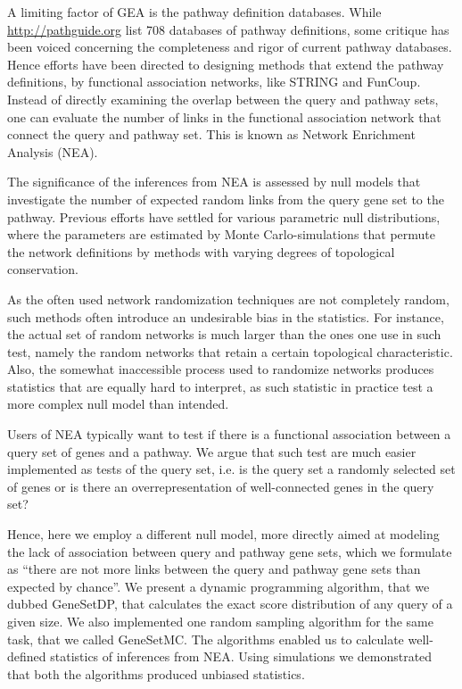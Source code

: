 \documentclass[a4paper,american]{lipics-v2016}
\begin{document}
A limiting factor of GEA is the pathway definition databases. While \url{http://pathguide.org} list 708 databases of pathway definitions\cite{bader2006pathguide},  some critique has been voiced concerning the completeness and rigor of current pathway databases. Hence efforts have been directed to designing methods that extend the pathway definitions, by functional association networks, like STRING\cite{szklarczyk2014string} and FunCoup\cite{ogris2017funcoup}. Instead of directly examining the overlap between the query and pathway sets, one can evaluate the number of links in the functional association network that connect the query and pathway set\cite{alexeyenko2012network, glaab2012enrichnet, mccormack2013statistical, ogris2016novel, signorelli2016neat}. This is known as Network Enrichment Analysis (NEA).

The significance of the inferences from NEA is assessed by null models that investigate the number of expected random links from the query gene set to the pathway. Previous efforts have settled for various parametric null distributions, where the parameters are estimated by Monte Carlo-simulations that permute the network definitions by methods with varying degrees of topological conservation.

As the often used network randomization techniques are not completely random, such methods often introduce an undesirable bias in the statistics. For instance, the actual set of random networks is much larger than the ones one use in such test, namely the random networks that retain a certain topological characteristic\cite{newman2001random}. Also, the somewhat inaccessible process used to randomize networks produces statistics that are equally hard to interpret, as such statistic in practice test a more complex null model than intended.

Users of NEA typically want to test if there is a functional association between a query set of genes and a pathway\cite{alexeyenko2012network}. We argue that such test are much easier implemented as tests of the query set, i.e. is the query set a randomly selected set of genes or is there an overrepresentation of well-connected genes in the query set?

Hence, here we employ a different null model, more directly aimed at modeling the lack of association between query and pathway gene sets, which we formulate as ``there are not more links between the query and pathway gene sets than expected by chance''. We present a dynamic programming algorithm, that we dubbed GeneSetDP, that calculates the exact score distribution of any query of a given size. We also implemented one random sampling algorithm for the same task, that we called GeneSetMC.
The algorithms enabled us to calculate well-defined statistics of inferences from NEA.  Using simulations we demonstrated that both the algorithms produced unbiased statistics.
\end{document}
